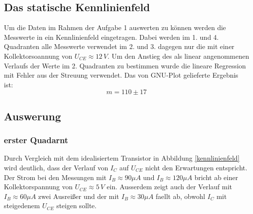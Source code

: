 \subsection{Das statische Kennlinienfeld}
Um die Daten im Rahmen der Aufgabe 1 auswerten zu können werden die Messwerte in ein Kennlinienfeld eingetragen. Dabei werden im 1. und 4. Quadranten alle Messwerte verwendet im 2. und 3. dagegen nur die mit einer Kollektorsoannung von \(U_{CE} \approx 12\,V \). Um den Anstieg des als linear angenommenen Verlaufs der Werte im 2. Quadranten zu bestimmen wurde die lineare Regression mit Fehler aus der Streuung verwendet. Das von GNU-Plot gelieferte Ergebnis ist:
\begin{equation}
m = 110 \pm 17
\end{equation}
\begin{center}
\begin{minipage}{\linewidth}
\centering
{}
%
\label{gnuplot_kennlinienfeld}
\end{minipage}
\end{center}
\subsection{Auswerung}
\subsubsection{erster Quadarnt}
Durch Vergleich mit dem idealisiertem Transistor in Abbildung \ref{kennlinienfeld} wird deutlich, dass der Verlauf von \(I_C\) auf \(U_{CE}\) nicht den Erwartungen entspricht. Der Strom bei den Messungen mit \(I_B \approx 90 \mu A\) und \(I_B \approx 120 \mu A\) bricht ab einer Kollektorspannung von \(U_{CE} \approx 5\, V\) ein. Ausserdem zeigt auch der Verlauf mit \(I_B \approx 60 \mu A\) zwei Ausreißer und der mit \(I_B \approx 30 \mu A\) faellt ab, obwohl \(I_C\) mit steigedenem \(U_{CE}\) steigen sollte.
